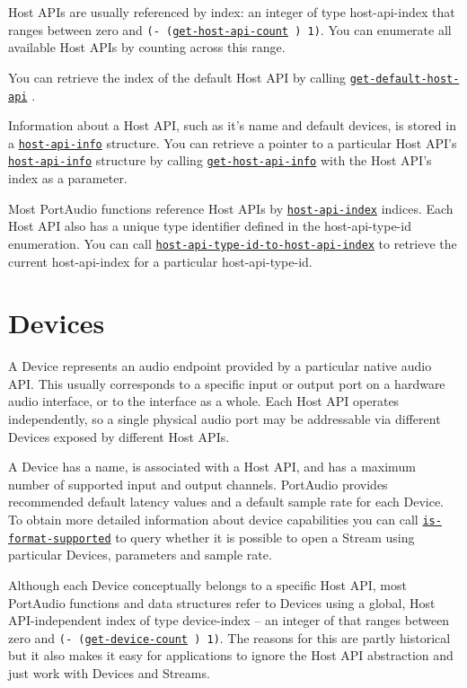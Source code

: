 \documentclass[a4paper]{report}
\begin{document}
Host APIs are usually referenced by index: an integer of type host-api-index that ranges between zero and \texttt{(- (\hyperref[portaudio__fun__get-host-api-count]{\texttt{get-host-api-count}}
  ) 1)}. You can enumerate all available Host APIs by counting across this range.

You can retrieve the index of the default Host API by calling \hyperref[portaudio__fun__get-default-host-api]{\texttt{get-default-host-api}}
  .

Information about a Host API, such as it's name and default devices, is stored in a \hyperref[portaudio__class__host-api-info]{\texttt{host-api-info}}
   structure. You can retrieve a pointer to a particular Host API's \hyperref[portaudio__class__host-api-info]{\texttt{host-api-info}}
   structure by calling \hyperref[portaudio__fun__get-host-api-info]{\texttt{get-host-api-info}}
   with the Host API's index as a parameter.

Most PortAudio functions reference Host APIs by \hyperref[portaudio__fun__host-api-index]{\texttt{host-api-index}}
   indices. Each Host API also has a unique type identifier defined in the host-api-type-id enumeration. You can call \hyperref[portaudio__fun__host-api-type-id-to-host-api-index]{\texttt{host-api-type-id-to-host-api-index}}
   to retrieve the current host-api-index for a particular host-api-type-id.\section{Devices} \label{d0d0e0e0e0e6}
A Device represents an audio endpoint provided by a particular native audio API. This usually corresponds to a specific input or output port on a hardware audio interface, or to the interface as a whole. Each Host API operates independently, so a single physical audio port may be addressable via different Devices exposed by different Host APIs.

A Device has a name, is associated with a Host API, and has a maximum number of supported input and output channels. PortAudio provides recommended default latency values and a default sample rate for each Device. To obtain more detailed information about device capabilities you can call \hyperref[portaudio__fun__is-format-supported]{\texttt{is-format-supported}}
   to query whether it is possible to open a Stream using particular Devices, parameters and sample rate.

Although each Device conceptually belongs to a specific Host API, most PortAudio functions and data structures refer to Devices using a global, Host API-independent index of type device-index – an integer of that ranges between zero and \texttt{(- (\hyperref[portaudio__fun__get-device-count]{\texttt{get-device-count}}
  ) 1)}. The reasons for this are partly historical but it also makes it easy for applications to ignore the Host API abstraction and just work with Devices and Streams.
\end{document}
